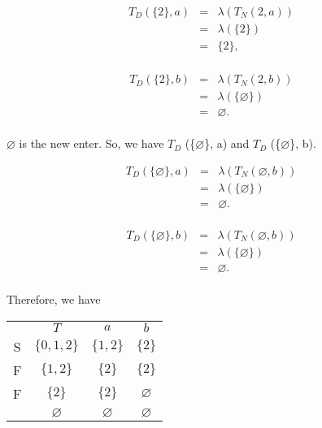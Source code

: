 \documentclass[12pt]{article}
\begin{document}
\begin{center}
\begin{eqnarray*}
T_D(\{2\}, a)
& = & \lambda(T_N(2,a)) \\
& = & \lambda(\{2\}) \\
& = & \{2\}, \\
\end{eqnarray*}
\end{center}

\begin{center}
\begin{eqnarray*}
T_D(\{2\}, b)
& = & \lambda(T_N(2,b)) \\
& = & \lambda(\{\varnothing\}) \\
& = & \varnothing. \\
\end{eqnarray*}
\end{center}

$\varnothing$ is the new enter. So, we have $T_D$ (\{$\varnothing$\}, a) and $T_D$ (\{$\varnothing$\}, b).\\

\begin{center}
\begin{eqnarray*}
T_D(\{\varnothing\}, a)
& = & \lambda(T_N(\varnothing,b)) \\
& = & \lambda(\{\varnothing\}) \\
& = & \varnothing. \\
\end{eqnarray*}
\end{center}

\begin{center}
\begin{eqnarray*}
T_D(\{\varnothing\}, b)
& = & \lambda(T_N(\varnothing,b)) \\
& = & \lambda(\{\varnothing\}) \\
& = & \varnothing. \\
\end{eqnarray*}
\end{center}

Therefore, we have 

\begin{center}
\hspace{0.5cm}
\begin{tabular}{cc|cc}
           & $T$           & $a$           & $b$         \\
     \cline{2-4}
     S   & $\{0, 1, 2\}$ & $\{1,2\}$     & $\{2\}$       \\
     F   & $\{1, 2\}$    & $\{2\}$       & $\{2\}$       \\
     F   & $\{2\}$       & $\{2\}$       & $\varnothing$ \\
         & $\varnothing$ & $\varnothing$ & $\varnothing$ \\
\end{tabular}
\end{center}
\end{document}
